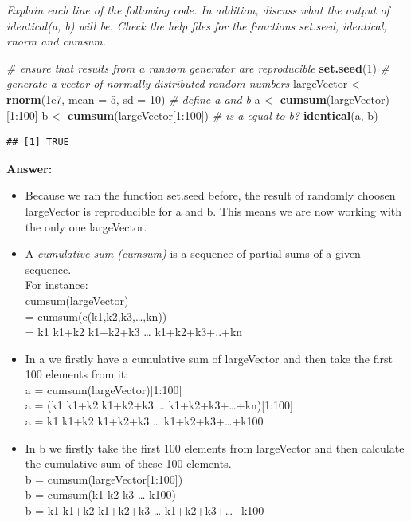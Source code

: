 \documentclass[12,]{article}
\newenvironment{Shaded}{\begin{snugshade}}{\end{snugshade}}
\newcommand{\KeywordTok}[1]{\textcolor[rgb]{0.13,0.29,0.53}{\textbf{{#1}}}}
\newcommand{\DataTypeTok}[1]{\textcolor[rgb]{0.13,0.29,0.53}{{#1}}}
\newcommand{\DecValTok}[1]{\textcolor[rgb]{0.00,0.00,0.81}{{#1}}}
\newcommand{\FloatTok}[1]{\textcolor[rgb]{0.00,0.00,0.81}{{#1}}}
\newcommand{\StringTok}[1]{\textcolor[rgb]{0.31,0.60,0.02}{{#1}}}
\newcommand{\CommentTok}[1]{\textcolor[rgb]{0.56,0.35,0.01}{\textit{{#1}}}}
\newcommand{\NormalTok}[1]{{#1}}
\begin{document}
\emph{Explain each line of the following code. In addition, discuss what
the output of identical(a, b) will be. Check the help files for the
functions set.seed, identical, rnorm and cumsum.}

\begin{Shaded}
\begin{Highlighting}[]
  \CommentTok{# ensure that results from a random generator are reproducible}
\KeywordTok{set.seed}\NormalTok{(}\DecValTok{1}\NormalTok{)}
  \CommentTok{# generate a vector of normally distributed random numbers}
\NormalTok{largeVector <-}\StringTok{ }\KeywordTok{rnorm}\NormalTok{(}\FloatTok{1e7}\NormalTok{, }\DataTypeTok{mean =} \DecValTok{5}\NormalTok{, }\DataTypeTok{sd =} \DecValTok{10}\NormalTok{) }
  \CommentTok{# define a and b}
\NormalTok{a <-}\StringTok{ }\KeywordTok{cumsum}\NormalTok{(largeVector)[}\DecValTok{1}\NormalTok{:}\DecValTok{100}\NormalTok{] }
\NormalTok{b <-}\StringTok{ }\KeywordTok{cumsum}\NormalTok{(largeVector[}\DecValTok{1}\NormalTok{:}\DecValTok{100}\NormalTok{])}
  \CommentTok{# is a equal to b?}
\KeywordTok{identical}\NormalTok{(a, b) }
\end{Highlighting}
\end{Shaded}

\begin{verbatim}
## [1] TRUE
\end{verbatim}

\textbf{Answer:}

\begin{itemize}
\item
  Because we ran the function set.seed before, the result of randomly
  choosen largeVector is reproducible for a and b. This means we are now
  working with the only one largeVector.
\item
  A \emph{cumulative sum (cumsum)} is a sequence of partial sums of a
  given sequence.\\
  For instance:\\
  cumsum(largeVector)\\
  = cumsum(c(k1,k2,k3,\ldots{},kn))\\
  = k1 k1+k2 k1+k2+k3 \ldots{} k1+k2+k3+..+kn
\item
  In a we firstly have a cumulative sum of largeVector and then take the
  first 100 elements from it:\\
  a = cumsum(largeVector){[}1:100{]}\\
  a = (k1 k1+k2 k1+k2+k3 \ldots{} k1+k2+k3+\ldots{}+kn){[}1:100{]}\\
  a = k1 k1+k2 k1+k2+k3 \ldots{} k1+k2+k3+\ldots{}+k100
\item
  In b we firstly take the first 100 elements from largeVector and then
  calculate the cumulative sum of these 100 elements.\\
  b = cumsum(largeVector{[}1:100{]})\\
  b = cumsum(k1 k2 k3 \ldots{} k100)\\
  b = k1 k1+k2 k1+k2+k3 \ldots{} k1+k2+k3+\ldots{}+k100
\end{itemize}
\end{document}
